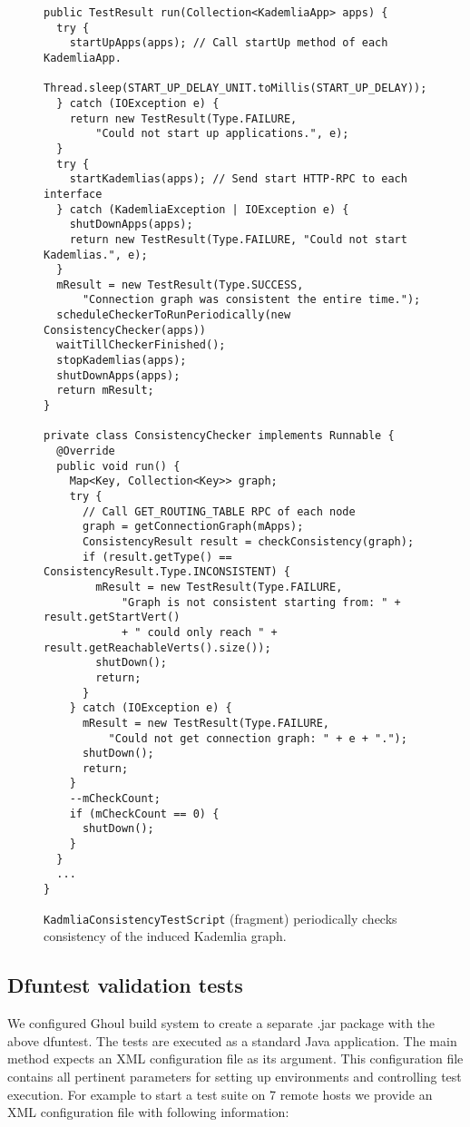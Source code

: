 \begin{figure}[tbp]
\begin{lstlisting}
public TestResult run(Collection<KademliaApp> apps) {
  try {
    startUpApps(apps); // Call startUp method of each KademliaApp.
    Thread.sleep(START_UP_DELAY_UNIT.toMillis(START_UP_DELAY));
  } catch (IOException e) {
    return new TestResult(Type.FAILURE,
        "Could not start up applications.", e);
  }
  try {
    startKademlias(apps); // Send start HTTP-RPC to each interface
  } catch (KademliaException | IOException e) {
    shutDownApps(apps);
    return new TestResult(Type.FAILURE, "Could not start Kademlias.", e);
  }
  mResult = new TestResult(Type.SUCCESS,
      "Connection graph was consistent the entire time.");
  scheduleCheckerToRunPeriodically(new ConsistencyChecker(apps))
  waitTillCheckerFinished();
  stopKademlias(apps);
  shutDownApps(apps);
  return mResult;
}

private class ConsistencyChecker implements Runnable {
  @Override
  public void run() {
    Map<Key, Collection<Key>> graph;
    try {
      // Call GET_ROUTING_TABLE RPC of each node
      graph = getConnectionGraph(mApps);
      ConsistencyResult result = checkConsistency(graph);
      if (result.getType() == ConsistencyResult.Type.INCONSISTENT) {
        mResult = new TestResult(Type.FAILURE,
            "Graph is not consistent starting from: " + result.getStartVert()
            + " could only reach " + result.getReachableVerts().size());
        shutDown();
        return;
      }
    } catch (IOException e) {
      mResult = new TestResult(Type.FAILURE,
          "Could not get connection graph: " + e + ".");
      shutDown();
      return;
    }
    --mCheckCount;
    if (mCheckCount == 0) {
      shutDown();
    }
  }
  ...
}
\end{lstlisting}
\caption{\texttt{KadmliaConsistencyTestScript} (fragment) periodically checks consistency of the induced Kademlia graph.}
\label{fig:core}
\end{figure}

\subsection{Dfuntest validation tests}

We configured Ghoul build system to create a separate .jar package with the above dfuntest.
The tests are executed as a standard Java application.
The main method expects an XML configuration file as its argument.
This configuration file contains all pertinent parameters for setting up
environments and controlling test execution.
For example to start a test suite on 7 remote hosts we provide an XML
configuration file with following information:

